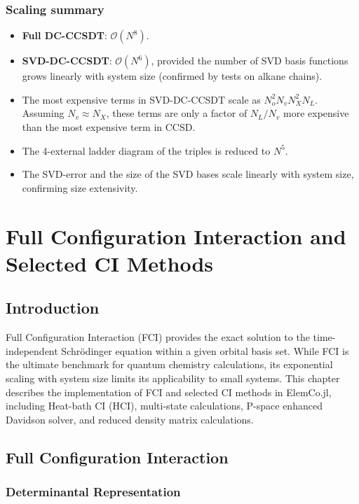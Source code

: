 \documentclass[a4paper,12pt,oneside]{book}
\newcommand{\elemcoil}{\textsf{ElemCo.jl}}
\begin{document}
\subsection{Scaling summary}
\begin{itemize}
\item \textbf{Full DC-CCSDT}: $\mathcal{O}(N^8)$.
\item \textbf{SVD-DC-CCSDT}: $\mathcal{O}(N^6)$, provided the number of SVD basis functions 
grows linearly with system size (confirmed by tests on alkane chains).
\item The most expensive terms in SVD-DC-CCSDT scale as $N_o^2 N_v N_X^2 N_L$.
Assuming $N_v \approx N_X$, these terms are only a factor of $N_L/N_v$ more expensive than the 
most expensive term in CCSD.
\item The 4-external ladder diagram of the triples is reduced to $N^5$.
\item The SVD-error and the size of the SVD bases scale linearly with system size, 
  confirming size extensivity.
\end{itemize}


\chapter{Full Configuration Interaction and Selected CI Methods}
\label{ch:fci}

\section{Introduction}

Full Configuration Interaction (FCI) provides the exact solution to the time-independent 
Schr\"odinger equation within a given orbital basis set. While FCI is the ultimate benchmark 
for quantum chemistry calculations, its exponential scaling with system size
limits its applicability to small systems.
This chapter describes the implementation of FCI and selected CI methods in \elemcoil,
including Heat-bath CI (HCI), multi-state calculations, P-space enhanced Davidson solver,
and reduced density matrix calculations.

\section{Full Configuration Interaction}
\label{sec:fci}

\subsection{Determinantal Representation}
\end{document}
